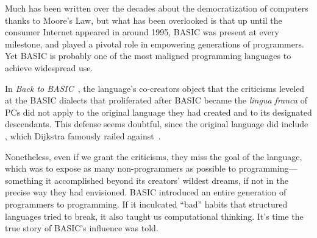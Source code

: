 



Much has been written over the decades about the democratization of
computers thanks to Moore's Law, but what has been overlooked is that up
until the consumer Internet appeared in around 1995, BASIC was present
at every milestone, and played a pivotal role in empowering generations
of programmers.
Yet BASIC is probably one of the most maligned programming languages
to achieve widespread use.

In \emph{Back to BASIC}~\cite{backtobasic}, the language's co-creators
object that the criticisms leveled at the 
BASIC dialects that proliferated after BASIC became the
\emph{lingua franca} of PCs did not apply to the original language
they had created and to its designated descendants.
This defense seems doubtful, since the original language did include
, which Dijkstra famously railed
against~\cite{goto_considered_harmful}.

Nonetheless, even if we grant the criticisms,
they miss the goal of the
language, which was to expose as many non-programmers as possible to
programming---something it accomplished beyond its creators' wildest dreams,
if not in the precise way they had envisioned.
BASIC introduced an entire generation of
programmers to programming.  If it inculcated ``bad'' habits that
structured languages tried to break,  it also taught us computational
thinking.    It's time the true story of BASIC's influence was told.

